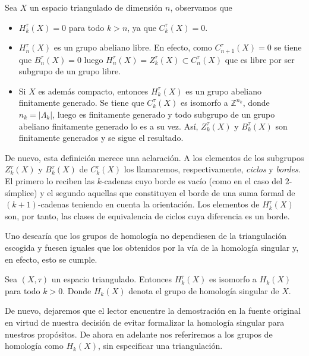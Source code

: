 \begin{remark} Sea $X$ un espacio triangulado de dimensión $n$, observamos que

    \begin{itemize}
        \item $H^{\tau}_k(X)=0$ para todo $k>n$, ya que $C^{\tau}_k(X)=0$.
        \item $H^{\tau}_n(X)$ es un grupo abeliano libre. En efecto, como $C^{\tau}_{n+1}(X)=0$ se tiene que $B^{\tau}_n(X)=0$ luego $H^{\tau}_n(X)=Z^{\tau}_k(X)\subset C^{\tau}_n(X)$ que es libre por ser subgrupo de un grupo libre.
        \item Si $X$ es además compacto, entonces $H^{\tau}_k(X)$ es un grupo abeliano finitamente generado. Se tiene que $C^{\tau}_k(X)$ es isomorfo a $\mathbb{Z}^{n_k}$, donde $n_k=|\Lambda_k|$, luego es finitamente generado y todo subgrupo de un grupo abeliano finitamente generado lo es a su vez. Así, $Z^{\tau}_k(X)$ y $B^{\tau}_k(X)$ son finitamente generados y se sigue el resultado.
    \end{itemize}
\end{remark}

De nuevo, esta definición merece una aclaración. A los elementos de los subgrupos $Z^{\tau}_k(X)$ y $B^{\tau}_k(X)$ de $C^{\tau}_k(X)$ los llamaremos, respectivamente, \textit{ciclos} y \textit{bordes}. El primero lo reciben las $k$-cadenas cuyo borde es vacío (como en el caso del $2$-símplice) y el segundo aquellas que constituyen el borde de una suma formal de $(k+1)$-cadenas teniendo en cuenta la orientación. Los elementos de $H^{\tau}_k(X)$ son, por tanto, las clases de equivalencia de ciclos cuya diferencia es un borde.

Uno desearía que los grupos de homología no dependiesen de la triangulación escogida y fuesen iguales que los obtenidos por la vía de la homología singular y, en efecto, esto se cumple. 

\begin{theorem}
    Sea $(X,\tau)$ un espacio triangulado. Entonces $H^{\tau}_k(X)$ es isomorfo a $H_k(X)$ para todo $k>0$. Donde $H_k(X)$ denota el grupo de homología singular de $X$.
\end{theorem}

De nuevo, dejaremos que el lector encuentre la demostración en la fuente original en virtud de nuestra decisión de evitar formalizar la homología singular para nuestros propósitos. De ahora en adelante nos referiremos a los grupos de homología como $H_k(X)$, sin especificar una triangulación.


